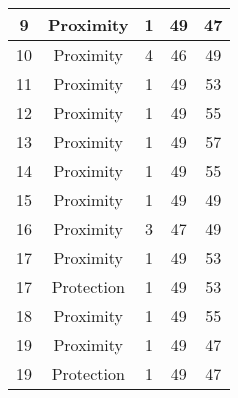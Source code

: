\documentclass[results.tex]{subfiles}
\begin{document}
\begin{center}
\begin{tabular}{| c || c | c | c | c |}
            \hline
            9                       & Proximity                    & 1                      & 49                      & 47                   \\
            \hline
            10                      & Proximity                    & 4                      & 46                      & 49                   \\
            \hline
            11                      & Proximity                    & 1                      & 49                      & 53                   \\
            \hline
            12                      & Proximity                    & 1                      & 49                      & 55                   \\
            \hline
            13                      & Proximity                    & 1                      & 49                      & 57                   \\
            \hline
            14                      & Proximity                    & 1                      & 49                      & 55                   \\
            \hline
            15                      & Proximity                    & 1                      & 49                      & 49                   \\
            \hline
            16                      & Proximity                    & 3                      & 47                      & 49                   \\
            \hline
            17                      & Proximity                    & 1                      & 49                      & 53                   \\
            \hline
            17                      & Protection                   & 1                      & 49                      & 53                   \\
            \hline
            18                      & Proximity                    & 1                      & 49                      & 55                   \\
            \hline
            19                      & Proximity                    & 1                      & 49                      & 47                   \\
            \hline
            19                      & Protection                   & 1                      & 49                      & 47                   \\

\end{tabular}
\end{center}
\end{document}
